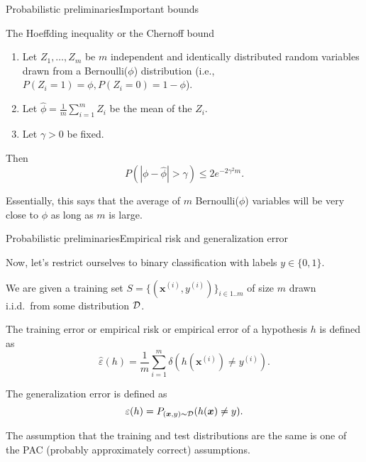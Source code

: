 \documentclass{beamer}
\renewcommand{\vec}[1]{\boldsymbol{#1}}
\begin{document}
\begin{frame}{Probabilistic preliminaries}{Important bounds}

  \begin{block}{The \alert{Hoeffding inequality} or the \alert{Chernoff bound}}

    \begin{enumerate}
    \item Let $Z_1, \ldots, Z_m$ be $m$ independent and identically
      distributed random variables drawn from a Bernoulli($\phi$)
      distribution (i.e., $P(Z_i=1)=\phi, P(Z_i=0)=1-\phi$).
    \item Let $\hat{\phi} = \frac{1}{m}\sum_{i=1}^m Z_i$ be the mean
      of the $Z_i$.
    \item Let $\gamma > 0$ be fixed.
    \end{enumerate}

    Then
    \[ P(|\phi-\hat{\phi}|>\gamma) \le 2 e^{-2\gamma^2m}. \]
  \end{block}

  \medskip

  Essentially, this says that the average of $m$ Bernoulli($\phi$) variables
  will be very close to $\phi$ as long as $m$ is large.
  
\end{frame}


\begin{frame}{Probabilistic preliminaries}{Empirical risk and generalization error}

  Now, let's restrict ourselves to binary classification with labels
  $y \in \{0,1\}$.

  \medskip

  We are given a training set $S = \{(\vec{x}^{(i)},y^{(i)})\}_{i \in 1..m }$ of
  size $m$ drawn i.i.d.\ from some distribution $\cal D$.

  \medskip

  The \alert{training error} or \alert{empirical risk} or
  \alert{empirical error} of a hypothesis $h$ is defined as
  \[ \hat{\varepsilon}(h) = \frac{1}{m}\sum_{i=1}^m \delta(h(\vec{x}^{(i)}) \ne y^{(i)}). \]

  \medskip

  The \alert{generalization error} is defined as
  \[ \varepsilon(h) = P_{(\vec{x},y)\sim \cal D}(h(\vec{x})\ne y). \]

  \medskip

  The assumption that the \alert{training and test distributions are
    the same} is one of the \alert{PAC} (probably approximately
  correct) assumptions.
  
\end{frame}
\end{document}
